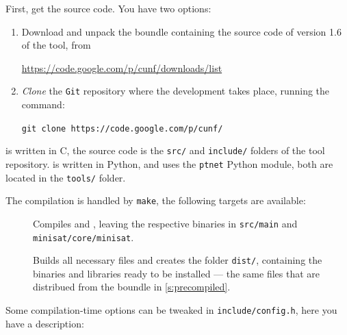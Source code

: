 \documentclass[a4paper]{refart}
\begin{document}
First, get the source code.  You have two options:
\begin{enumerate}
\item
  Download and unpack the boundle containing the source code of version 1.6 of
  the tool, from
  \begin{center}
  \url{https://code.google.com/p/cunf/downloads/list}
  \end{center}
\item
  \textit{Clone} the \verb!Git! repository where the development takes place,
  running the command:
  \begin{center}
  \verb!git clone https://code.google.com/p/cunf/!
  \end{center}
\end{enumerate}

\cunf is written in C, the source code is the \verb!src/! and
\verb!include/! folders of the tool repository. \cna is
written in Python, and uses the \verb!ptnet! Python module,
both are located in the \verb!tools/! folder.

The compilation is handled by \verb!make!, the following targets are available:
\begin{description}
\item[]
  Compiles \cunf and \minisat, leaving the respective binaries in
  \verb!src/main! and \verb!minisat/core/minisat!.
\item[]
  Builds all necessary files and creates the folder \verb!dist/!, containing
  the binaries and libraries ready to be installed --- the same files that are
  distribued from the boundle in \cref{s:precompiled}.
\end{description}

Some compilation-time options can be tweaked in \verb!include/config.h!, here
you have a description:
\end{document}
